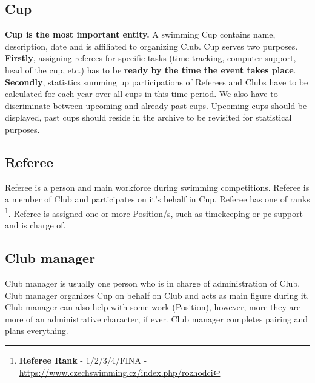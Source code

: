 \subsection*{Cup}
\textbf{Cup is the most important entity.} A swimming Cup contains name, description, date and is affiliated to organizing Club.
Cup serves two purposes. \textbf{Firstly}, assigning referees for specific tasks (time tracking, computer support, head of the cup, etc.) has to be \textbf{ready by the time the event takes place}. \textbf{Secondly}, statistics summing up participations of Referees and Clubs have to be calculated for each year over all cups in this time period. We also have to discriminate between upcoming and already past cups. Upcoming cups should be displayed, past cups should reside in the archive to be revisited for statistical purposes.

\subsection*{Referee}
Referee is a person and main workforce during swimming competitions. Referee is a member of Club and participates on it's behalf in Cup. Referee has one of ranks  \footnote{\textbf{Referee Rank} - 1/2/3/4/FINA - \url{https://www.czechswimming.cz/index.php/rozhodci}}. Referee is assigned one or more Position/s, such as \underline{timekeeping} or \underline{pc support} and is charge of. 
\subsection*{Club manager}
Club manager is usually one person who is in charge of administration of Club. Club manager organizes Cup on behalf on Club and acts as main figure during it. Club manager can also help with some work (Position), however, more they are more of an administrative character, if ever. Club manager completes pairing and plans everything. 
